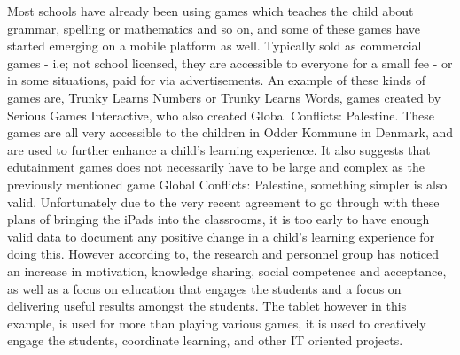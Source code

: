 Most schools have already been using games which teaches the child about grammar, spelling or mathematics and so on, and some of these games have started emerging on a mobile platform as well. Typically sold as commercial games - i.e; not school licensed, they are accessible to everyone for a small fee - or in some situations, paid for via advertisements. An example of these kinds of games are, Trunky Learns Numbers or Trunky Learns Words, games created by Serious Games Interactive, who also created Global Conflicts: Palestine. These games are all very accessible to the children in Odder Kommune in Denmark, and are used to further enhance a child's learning experience\cite{odderipad}. It also suggests that edutainment games does not necessarily have to be large and complex as the previously mentioned game Global Conflicts: Palestine, something simpler is also valid. Unfortunately due to the very recent agreement to go through with these plans of bringing the iPads into the classrooms, it is too early to have enough valid data to document any positive change in a child's learning experience for doing this. However according to\cite{odderipadpjece}, the research and personnel group has noticed an increase in motivation, knowledge sharing, social competence and acceptance, as well as a focus on education that engages the students and a focus on delivering useful results amongst the students. The tablet however in this example, is used for more than playing various games, it is used to creatively engage the students, coordinate learning, and other IT oriented projects\cite{odderipadpjece}.